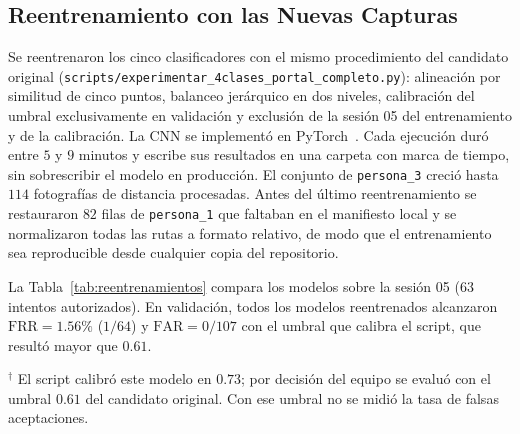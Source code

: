\documentclass{article}
\begin{document}
\subsection{Reentrenamiento con las Nuevas Capturas}
Se reentrenaron los cinco clasificadores con el mismo procedimiento del candidato original (\texttt{scripts/experimentar\_4clases\_portal\_completo.py}): alineación por similitud de cinco puntos, balanceo jerárquico en dos niveles, calibración del umbral exclusivamente en validación y exclusión de la sesión 05 del entrenamiento y de la calibración. La CNN se implementó en PyTorch~\cite{paszke2019pytorch}. Cada ejecución duró entre $5$ y $9$ minutos y escribe sus resultados en una carpeta con marca de tiempo, sin sobrescribir el modelo en producción. El conjunto de \texttt{persona\_3} creció hasta $114$ fotografías de distancia procesadas. Antes del último reentrenamiento se restauraron $82$ filas de \texttt{persona\_1} que faltaban en el manifiesto local y se normalizaron todas las rutas a formato relativo, de modo que el entrenamiento sea reproducible desde cualquier copia del repositorio.

La Tabla~\ref{tab:reentrenamientos} compara los modelos sobre la sesión 05 ($63$ intentos autorizados). En validación, todos los modelos reentrenados alcanzaron $\text{FRR} = 1.56\%$ ($1/64$) y $\text{FAR} = 0/107$ con el umbral que calibra el script, que resultó mayor que $0.61$.

\begin{table}[H]
\centering
\caption{Comparación sobre la sesión 05 (identificaciones correctas por persona y puertas cerradas a autorizados).}
\label{tab:reentrenamientos}

\smallskip
{\footnotesize $^{\dagger}$ El script calibró este modelo en $0.73$; por decisión del equipo se evaluó con el umbral $0.61$ del candidato original. Con ese umbral no se midió la tasa de falsas aceptaciones.}
\end{table}
\end{document}
